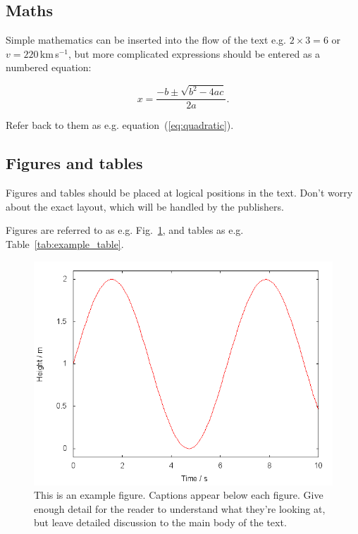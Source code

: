 \documentclass[a4paper,fleqn,usenatbib]{mnras}
\begin{document}
\subsection{Maths}
\label{sec:maths} %

Simple mathematics can be inserted into the flow of the text e.g. $2\times3=6$
or $v=220$\,km\,s$^{-1}$, but more complicated expressions should be entered
as a numbered equation:

\begin{equation}
    x=\frac{-b\pm\sqrt{b^2-4ac}}{2a}.
	\label{eq:quadratic}
\end{equation}

Refer back to them as e.g. equation~(\ref{eq:quadratic}).

\subsection{Figures and tables}

Figures and tables should be placed at logical positions in the text. Don't
worry about the exact layout, which will be handled by the publishers.

Figures are referred to as e.g. Fig.~\ref{fig:example_figure}, and tables as
e.g. Table~\ref{tab:example_table}.

\begin{figure}
	\includegraphics[width=\columnwidth]{example}
    \caption{This is an example figure. Captions appear below each figure.
	Give enough detail for the reader to understand what they're looking at,
	but leave detailed discussion to the main body of the text.}
    \label{fig:example_figure}
\end{figure}
\end{document}
